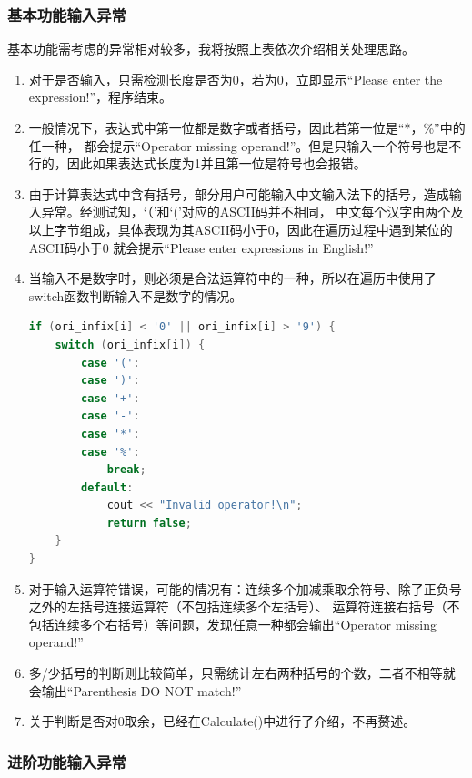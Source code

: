 \documentclass[a4paper, 11pt, UTF8]{ctexart}
\begin{document}
\subsubsection{基本功能输入异常}

基本功能需考虑的异常相对较多，我将按照上表依次介绍相关处理思路。

\begin{enumerate}
    \item 对于是否输入，只需检测长度是否为0，若为0，立即显示“Please enter the expression!”，程序结束。
    \item 一般情况下，表达式中第一位都是数字或者括号，因此若第一位是“*，\%”中的任一种，
          都会提示“Operator missing operand!”。但是只输入一个符号也是不行的，因此如果表达式长度为1并且第一位是符号也会报错。
    \item 由于计算表达式中含有括号，部分用户可能输入中文输入法下的括号，造成输入异常。经测试知，‘（’和‘(’对应的ASCII码并不相同，
          中文每个汉字由两个及以上字节组成，具体表现为其ASCII码小于0，因此在遍历过程中遇到某位的ASCII码小于0
          就会提示“Please enter expressions in English!”
    \item 当输入不是数字时，则必须是合法运算符中的一种，所以在遍历中使用了switch函数判断输入不是数字的情况。
          \begin{lstlisting}[language=C++, basicstyle=\ttfamily]
if (ori_infix[i] < '0' || ori_infix[i] > '9') {
    switch (ori_infix[i]) {
        case '(':
        case ')':
        case '+':
        case '-':
        case '*':
        case '%':
            break;
        default:
            cout << "Invalid operator!\n";
            return false;
    }
}
          \end{lstlisting}
    \item 对于输入运算符错误，可能的情况有：连续多个加减乘取余符号、除了正负号之外的左括号连接运算符（不包括连续多个左括号）、
          运算符连接右括号（不包括连续多个右括号）等问题，发现任意一种都会输出“Operator missing operand!”
    \item 多/少括号的判断则比较简单，只需统计左右两种括号的个数，二者不相等就会输出“Parenthesis DO NOT match!”
    \item 关于判断是否对0取余，已经在Calculate()中进行了介绍，不再赘述。
\end{enumerate}

\subsubsection{进阶功能输入异常}
\end{document}

